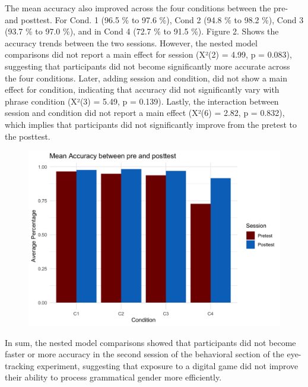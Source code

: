 \documentclass[
  man,floatsintext]{apa6}
\begin{document}
The mean accuracy also improved across the four conditions between the pre- and posttest. For Cond. 1 (96.5 \% to 97.6 \%), Cond 2 (94.8 \% to 98.2 \%), Cond 3 (93.7 \% to 97.0 \%), and in Cond 4 (72.7 \% to 91.5 \%). Figure 2. Shows the accuracy trends between the two sessions. However, the nested model comparisons did not report a main effect for session (X²(2) = 4.99, p = 0.083), suggesting that participants did not become significantly more accurate across the four conditions. Later, adding session and condition, did not show a main effect for condition, indicating that accuracy did not significantly vary with phrase condition (X²(3) = 5.49, p = 0.139). Lastly, the interaction between session and condition did not report a main effect (X²(6) = 2.82, p = 0.832), which implies that participants did not significantly improve from the pretest to the posttest.

\begin{figure}
\includegraphics[width=4.72in]{../Plots/Accuracy} \caption{ }\label{fig:unnamed-chunk-2}
\end{figure}

In sum, the nested model comparisons showed that participants did not become faster or more accuracy in the second session of the behavioral section of the eye-tracking experiment, suggesting that exposure to a digital game did not improve their ability to process grammatical gender more efficiently.
\end{document}

